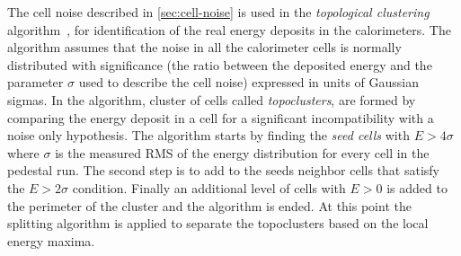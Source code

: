 The cell noise described in \cref{sec:cell-noise} is used in the
\emph{topological clustering} algorithm~\cite{JetCluster}, for identification of
the real energy deposits in the calorimeters. The algorithm assumes that the
noise in all the calorimeter cells is normally distributed with significance
(the ratio between the deposited energy and the parameter $\sigma$ used to
describe the cell noise) expressed in units of Gaussian sigmas. In the
algorithm, cluster of cells called \emph{topoclusters}, are formed by comparing
the energy deposit in a cell for a significant incompatibility with a noise only
hypothesis. The algorithm starts by finding the \emph{seed cells} with
$E > 4 \sigma$ where $\sigma$ is the measured RMS of the energy distribution for
every cell in the pedestal run. The second step is to add to the seeds neighbor
cells that satisfy the $E > 2 \sigma$ condition. Finally an additional level of
cells with $E > 0$ is added to the perimeter of the cluster and the algorithm is
ended. At this point the splitting algorithm is applied to separate the
topoclusters based on the local energy maxima.
